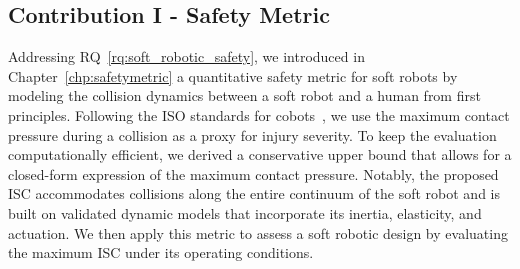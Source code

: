 \subsection{Contribution I - Safety Metric}
Addressing RQ~\ref{rq:soft_robotic_safety}, we introduced in Chapter~\ref{chp:safetymetric} a quantitative safety metric for soft robots by modeling the collision dynamics between a soft robot and a human from first principles. Following the ISO standards for cobots~\citep{Isots_15066_2016}, we use the maximum contact pressure during a collision as a proxy for injury severity. To keep the evaluation computationally efficient, we derived a conservative upper bound that allows for a closed-form expression of the maximum contact pressure. Notably, the proposed \gls{ISC} accommodates collisions along the entire continuum of the soft robot and is built on validated dynamic models that incorporate its inertia, elasticity, and actuation. We then apply this metric to assess a soft robotic design by evaluating the maximum \gls{ISC} under its operating conditions.

